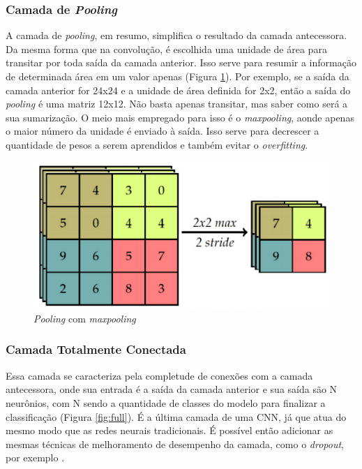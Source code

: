 \subsubsection{Camada de \textit{Pooling}}

A camada de \textit{pooling}, em resumo, simplifica o resultado da camada antecessora. Da mesma forma que na convolução, é escolhida uma unidade de área para transitar por toda saída da camada anterior. Isso serve para resumir a informação de determinada área em um valor apenas (Figura \ref{fig:pooling}). Por exemplo, se a saída da camada anterior for 24x24 e a unidade de área definida for 2x2, então a saída do \textit{pooling} é uma matriz 12x12. Não basta apenas transitar, mas saber como será a sua sumarização. O meio mais empregado para isso é o \textit{maxpooling}, aonde apenas o maior número da unidade é enviado à saída. Isso serve para decrescer a quantidade de pesos a serem aprendidos e também evitar o \textit{overfitting}.

\begin{figure}
    \centering
    \includegraphics[scale=0.3]{Relatorio/figuras/pooling.png}
    \caption{\textit{Pooling} com \textit{maxpooling} \cite{santos2018identificaccao}}
    \label{fig:pooling}
\end{figure}


\subsubsection{Camada Totalmente Conectada}

Essa camada se caracteriza pela completude de conexões com a camada antecessora, onde sua entrada é a saída da camada anterior e sua saída são N neurônios, com N sendo a quantidade de classes do modelo para finalizar a classificação (Figura  \ref{fig:full}). É a última camada de uma CNN, já que atua do mesmo modo que as redes neurais tradicionais. É possível então adicionar as mesmas técnicas de melhoramento de desempenho da camada, como o \textit{dropout}, por exemplo \cite{eliveltoebermamrenatoa.krohling2018}.

